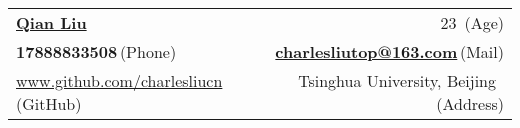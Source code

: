 \newcommand{\myheader}{
\begin{tabular*}{\textwidth}{l@{\extracolsep{\fill}}r}
  \textbf{\href{http://www.github.com/charlesliucn}{\LARGE Qian Liu}} & 23$\,$ {\color{labelgrey}(Age)} \\
  \textbf{17888833508}$\,${\color{labelgrey}(Phone)} & \href{mailto:charlesliutop@163.com}{\textbf{charlesliutop@163.com}}$\,${\color{labelgrey}(Mail)}\\
  \href{http://www.github.com/charlesliucn}{www.github.com/charlesliucn}$\,${\color{labelgrey}(GitHub)} & Tsinghua University, Beijing $\,${\color{labelgrey}(Address)}\\
  \end{tabular*}\\\vspace{0.15in}}

\myheader